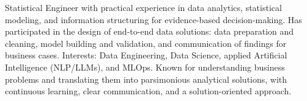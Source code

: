 
\begin{cvparagraph}

Statistical Engineer with practical experience in data analytics, statistical modeling, and information structuring for evidence-based decision-making. Has participated in the design of end-to-end data solutions: data preparation and cleaning, model building and validation, and communication of findings for business cases. Interests: Data Engineering, Data Science, applied Artificial Intelligence (NLP/LLMs), and MLOps. Known for understanding business problems and translating them into parsimonious analytical solutions, with continuous learning, clear communication, and a solution-oriented approach.

\end{cvparagraph}
